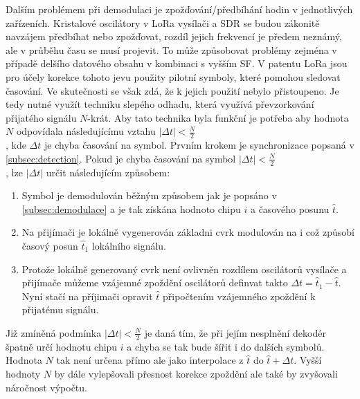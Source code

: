 \documentclass{ctuthesis}
\begin{document}
Dalším problémem při demodulaci je zpožďování/předbíhání hodin v jednotlivých zařízeních. Kristalové oscilátory v LoRa vysílači a SDR se budou zákonitě navzájem předbíhat nebo zpožďovat, rozdíl jejich frekvencí je předem neznámý, ale v průběhu času se musí projevit. To může způsobovat problémy zejména v případě delšího datového obsahu v kombinaci s vyšším SF. V patentu LoRa jsou pro účely korekce tohoto jevu použity pilotní symboly, které pomohou sledovat časování. Ve skutečnosti se však zdá, že k jejich použití nebylo přistoupeno. Je tedy nutné využít techniku slepého odhadu, která využívá převzorkování přijatého signálu $N$-krát. Aby tato technika byla funkční je potřeba aby hodnota $N$ odpovídala následujícímu vztahu $\lvert\Delta t \rvert < \frac{N}{2}$\\, kde $\Delta t$ je chyba časování na symbol.
Prvním krokem je synchronizace popsaná v \ref{subsec:detection}. Pokud je chyba časování na symbol  $\lvert\Delta t \rvert < \frac{N}{2}$\\, lze $\lvert\Delta t \rvert$ určit následujícím způsobem:
\begin{enumerate}
\item
Symbol je demodulován běžným způsobem jak je popsáno v \ref{subsec:demodulace} a je tak získána hodnoto chipu $i$  a časového posunu $\hat{t}$.
\item
Na přijímači je lokálně vygenerován základni cvrk modulován na i což způsobí časový posun $\hat{t}_1$ lokálního signálu.
\item
Protože lokálně generovaný cvrk není ovlivněn rozdílem oscilátorů vysílače a přijímače můžeme vzájemné zpoždění oscilátorů definvat takto $\Delta t = \hat{t}_1 - \hat{t}$. Nyní stačí na příjimači opravit $\hat{t}$ připočtením vzájemného zpoždění k přijatému signálu.
\end{enumerate}
Již zmíněná podmínka $\lvert\Delta t \rvert < \frac{N}{2}$ je daná tím, že při jejím nesplnění dekodér špatně určí hodnotu chipu $i$ a chyba se tak bude šířit i do dalších symbolů. Hodnota $N$ tak není určena přímo ale jako interpolace z $\hat{t}$ do $\hat{t} + \Delta t$. Vyšší hodnoty $N$ by dále vylepšovali přesnost korekce zpoždění ale také by zvyšovali náročnost výpočtu.
\end{document}
